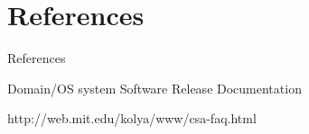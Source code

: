 \documentclass{beamer}
\begin{document}
\section{References}

\begin{frame}{References}
	\begin{thebibliography}{3}
	
	\beamertemplatebookbibitems
	\bibitem{}
   	 
   	 \beamertemplatebookbibitems
   	 \bibitem{}
   	 \newblock Domain/OS system Software Release Documentation
   	 
   	 \beamertemplatearticlebibitems
   	 \bibitem{}
   	 \newblock http://web.mit.edu/kolya/www/csa-faq.html
   	 
   	 \end{thebibliography}
\end{frame}
\end{document}

